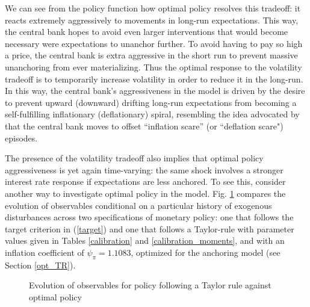 \documentclass[11pt]{article}
\def \myFigPath {../../figures/}
\renewcommand{\[}{\begin{equation}}
\renewcommand{\]}{\end{equation}}
\def\fignamePEAobsTR{implement_anchTC_obs_TR_approx24_Sep_2020_09_32_19}
\def\fignamePEAobsAnch{implement_anchTC_obs_approx24_Sep_2020_09_35_43}
\begin{document}
We can see from the policy function how optimal policy resolves this tradeoff: it reacts extremely aggressively to movements in long-run expectations. This way, the central bank hopes to avoid even larger interventions that would become necessary were expectations to unanchor further. To avoid having to pay so high a price, the central bank is extra aggressive in the short run to prevent massive unanchoring from ever materializing. Thus the optimal response to the volatility tradeoff is to temporarily increase volatility in order to reduce it in the long-run. In this way, the central bank's aggressiveness in the model is driven by the desire to prevent upward (downward) drifting long-run expectations from becoming a self-fulfilling inflationary (deflationary) spiral, resembling the idea advocated by \cite{goodfriend1993interest} that the central bank moves to offset ``inflation scare'' (or ``deflation scare") episodes.

The presence of the volatility tradeoff also implies that optimal policy aggressiveness is yet again time-varying: the same shock involves a stronger interest rate response if expectations are less anchored. To see this, consider another way to investigate optimal policy in the model. Fig. \ref{pea_TCvsTR} compares the evolution of observables conditional on a particular history of exogenous disturbances across two specifications of monetary policy: one that follows the target criterion in (\ref{target}) and one that follows a Taylor-rule with parameter values given in Tables \ref{calibration} and \ref{calibration_moments}, and with an inflation coefficient of $\psi_{\pi} = 1.1083$, optimized for the anchoring model (see Section \ref{opt_TR}).

\begin{figure}[h!]
\hfill %
\caption{Evolution of observables for policy following a Taylor rule against optimal policy}
\label{pea_TCvsTR}
\end{figure}
\end{document}
